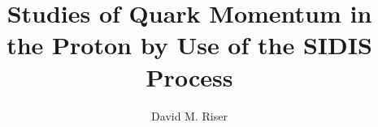 \abstract{
        
}

\title{Studies of Quark Momentum in the Proton by Use of the SIDIS Process}
\author{David M. Riser}




\dedication{
        \textit{Dedicated to my grandfather, Abdul Qaissaunee}
}

\acknowledgements{
        
}
